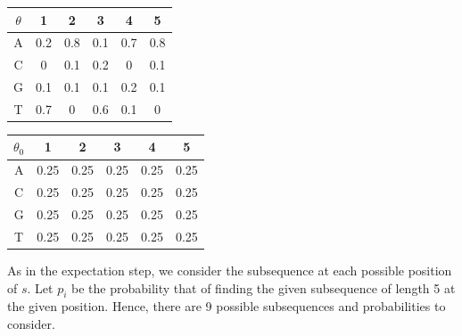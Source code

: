 \begin{table}[ht]
\begin{minipage}[b]{0.5\linewidth}\centering
\begin{tabular}{|c|c|c|c|c|c|}
\hline
$\theta$ &1&2&3&4&5\\
\hline
A&0.2&0.8&0.1&0.7&0.8\\
\hline
C&0&0.1&0.2&0&0.1\\
\hline
G&0.1&0.1&0.1&0.2&0.1\\
\hline
T&0.7&0&0.6&0.1&0\\
\hline
\end{tabular}
\end{minipage}
\hspace{0.5cm}
\begin{minipage}[b]{0.5\linewidth}
\centering
\begin{tabular}{|c|c|c|c|c|c|}
\hline
$\theta_0$ &1&2&3&4&5\\
\hline
A&0.25&0.25&0.25&0.25&0.25\\
\hline
C&0.25&0.25&0.25&0.25&0.25\\
\hline
G&0.25&0.25&0.25&0.25&0.25\\
\hline
T&0.25&0.25&0.25&0.25&0.25\\
\hline
\end{tabular}
\end{minipage}
\end{table}

As in the expectation step, we consider the subsequence at each possible position of $s$.  Let $p_i$ be the probability that of finding the given subsequence of length 5 at the given position.  Hence, there are 9 possible subsequences and probabilities to consider.

